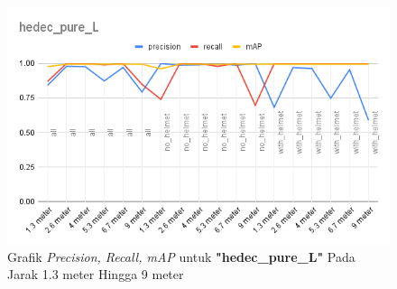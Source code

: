 \begin{enumerate}
  \newpage
  \begin{figure} [h!]
    \centering
    \includegraphics[width=1\textwidth]{gambar/BerdasarkanJarak/hedec_pure_L.png}
    \caption{Grafik \emph{Precision, Recall, mAP} untuk \textbf{"hedec\_pure\_L"} Pada Jarak 1.3 meter Hingga 9 meter}
    \label{fig:grafvaljarak_hedec_pure_L}  
  \end{figure}


\end{enumerate}
